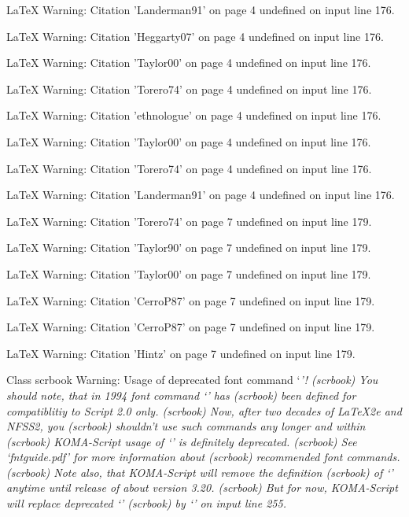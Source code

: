 LaTeX Warning: Citation 'Landerman91' on page 4 undefined on input line 176.


LaTeX Warning: Citation 'Heggarty07' on page 4 undefined on input line 176.


LaTeX Warning: Citation 'Taylor00' on page 4 undefined on input line 176.


LaTeX Warning: Citation 'Torero74' on page 4 undefined on input line 176.


LaTeX Warning: Citation 'ethnologue' on page 4 undefined on input line 176.


LaTeX Warning: Citation 'Taylor00' on page 4 undefined on input line 176.


LaTeX Warning: Citation 'Torero74' on page 4 undefined on input line 176.


LaTeX Warning: Citation 'Landerman91' on page 4 undefined on input line 176.


LaTeX Warning: Citation 'Torero74' on page 7 undefined on input line 179.


LaTeX Warning: Citation 'Taylor90' on page 7 undefined on input line 179.


LaTeX Warning: Citation 'Taylor00' on page 7 undefined on input line 179.


LaTeX Warning: Citation 'CerroP87' on page 7 undefined on input line 179.


LaTeX Warning: Citation 'CerroP87' on page 7 undefined on input line 179.


LaTeX Warning: Citation 'Hintz' on page 7 undefined on input line 179.


Class scrbook Warning: Usage of deprecated font command `\it'!
(scrbook)              You should note, that in 1994 font command `\it' has
(scrbook)              been defined for compatiblitiy to Script 2.0 only.
(scrbook)              Now, after two decades of LaTeX2e and NFSS2, you
(scrbook)              shouldn't use such commands any longer and within
(scrbook)              KOMA-Script usage of `\it' is definitely deprecated.
(scrbook)              See `fntguide.pdf' for more information about
(scrbook)              recommended font commands.
(scrbook)              Note also, that KOMA-Script will remove the definition
(scrbook)              of `\it' anytime until release of about version 3.20.
(scrbook)              But for now, KOMA-Script will replace deprecated `\it'
(scrbook)              by `\normalfont \itshape ' on input line 255.


